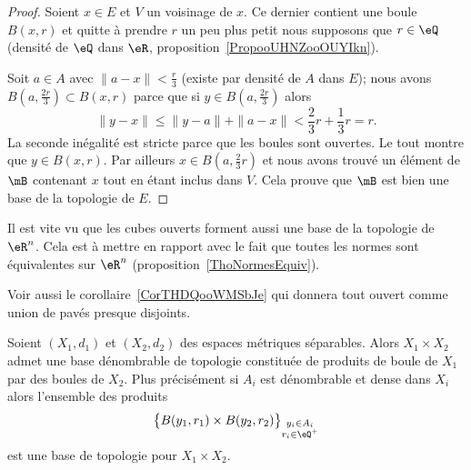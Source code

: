 \begin{proof}
    Soient \( x\in E\) et \( V\) un voisinage de \( x\). Ce dernier contient une boule \( B(x,r)\) et quitte à prendre \( r\) un peu plus petit nous supposons que \( r\in \eQ\) (densité de \( \eQ\) dans \( \eR\), proposition~\ref{PropooUHNZooOUYIkn}).

    Soit \( a\in A\) avec \( \| a-x \|<\frac{ r }{ 3 }\) (existe par densité de \( A\) dans \( E\)); nous avons \( B(a,\frac{ 2r }{ 3 })\subset B(x,r)\) parce que si \( y\in B( a,\frac{ 2r }{ 3 } )\) alors
    \begin{equation}
        \| y-x \|\leq \| y-a \|+\| a-x \|<\frac{ 2 }{ 3 }r+\frac{ 1 }{ 3 }r=r.
    \end{equation}
    La seconde inégalité est stricte parce que les boules sont ouvertes. Le tout montre que \( y\in B(x,r)\). Par ailleurs \( x\in B(a,\frac{ 2 }{ 3 }r)\) et nous avons trouvé un élément de \( \mB\) contenant \( x\) tout en étant inclus dans \( V\). Cela prouve que \( \mB\) est bien une base de la topologie de \( E\).
\end{proof}


\begin{remark}      \label{RemIPVLooHUXyeW}
    Il est vite vu que les cubes ouverts forment aussi une base de la topologie de \( \eR^n\). Cela est à mettre en rapport avec le fait que toutes les normes sont équivalentes sur \( \eR^n\) (proposition~\ref{ThoNormesEquiv}).


    Voir aussi le corollaire~\ref{CorTHDQooWMSbJe} qui donnera tout ouvert comme union de pavés presque disjoints.
\end{remark}

\begin{lemma}   \label{LemDUJXooWsnmpL}
    Soient \( (X_1,d_1)\) et \( (X_2,d_2)\) des espaces métriques séparables. Alors \( X_1\times X_2\) admet une base dénombrable de topologie constituée de produits de boule de \( X_1\) par des boules de \( X_2\). Plus précisément si $A_i$ est dénombrable et dense dans \( X_i\) alors l'ensemble des produits
    \begin{equation}
        \big\{ B(y_1,r_1)\times B(y_2,r_2)\big\}_{\substack{y_i\in A_i\\r_i\in \eQ^+}}
    \end{equation}
    est une base de topologie pour \( X_1\times X_2\).
\end{lemma}

